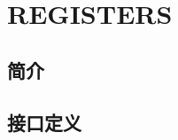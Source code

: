 \documentclass{article}
\begin{document}
\FloatBarrier

\section{REGISTERS\label{sec:REGISTERS}}

\subsection{简介}

\FloatBarrier
\subsection{接口定义}

\begin{center}




    \tablelasttail{\bottomrule}

    \small
    \begin{supertabular}{llllp{4cm}p{3cm}}


\end{supertabular}
\end{center}
\end{document}
